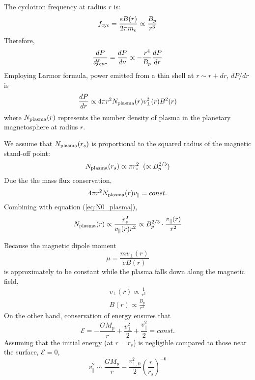 \documentclass{emulateapj}
\begin{document}
The cyclotron frequency at radius $r$ is:
\begin{equation}
f_{\rm cyc} = \frac{e B(r)}{2\pi m_e} \propto \frac{B_p}{r^3}
\end{equation}
Therefore, 
\begin{equation}
\frac{dP}{df_{\rm cyc}} = \frac{dP}{d\nu } \propto -\frac{r^4}{B_p} \frac{dP}{dr}
\end{equation}
Employing Larmor formula, power emitted from a thin shell at $r\sim r+dr$, $dP/dr$ is 
\begin{equation}
\frac{dP}{dr} \propto 4\pi r^2 N_{\rm plasma}(r) v_{\bot }^2(r) B^2(r) \label{eq:larmor}
\end{equation}
where $N_{\rm plasma}(r) $ represents the number density of plasma in the planetary magnetosphere at radius $r$. 

We assume that $N_{\rm plasma}(r_s) $  is proportional to the squared radius of the magnetic stand-off point:
\begin{equation}
N_{\rm plasma}(r_s) \propto \pi r_s^2 \;\;(\propto B_p^{2/3}) \label{eq:N0_plasma}
\end{equation}
Due the the mass flux conservation,
\begin{equation}
4 \pi r^2 N_{\rm plasma}(r) v_{\|} = const.
\end{equation}
Combining with equation (\ref{eq:N0_plasma}),
\begin{equation}
N_{\rm plasma}(r) \propto  \frac{r_s^2 }{v_{\|}(r) r^2} \propto  B_p^{2/3} \cdot \frac{v_{\|}(r)}{r^2}
\end{equation}

Because the magnetic dipole moment
\begin{equation}
\mu = \frac{mv_{\bot}(r)}{eB(r)}
\end{equation}
is approximately to be constant while the plasma falls down along the magnetic field, 
\begin{eqnarray}
v_{\bot }(r) \propto \frac{1}{r^3} \label{eq:v_bot} \\
B(r) \propto \frac{B_p}{r^3} 
\end{eqnarray}
On the other hand, conservation of energy ensures that
\begin{equation}
\mathcal{E} = -\frac{GM_p}{r} + \frac{v_{\bot }^2}{2} + \frac{v_{\|}^2}{2}=const.
\end{equation}
Assuming that the initial energy (at $r=r_s$) is negligible compared to those near the surface, $\mathcal{E}=0$, 
\begin{equation}
v_{\|}^2 \sim \frac{GM_p}{r} - \frac{v_{\bot ,0}^2}{2} \left( \frac{r}{r_s} \right)^{-6} \label{eq:v_||}
\end{equation}
\end{document}
